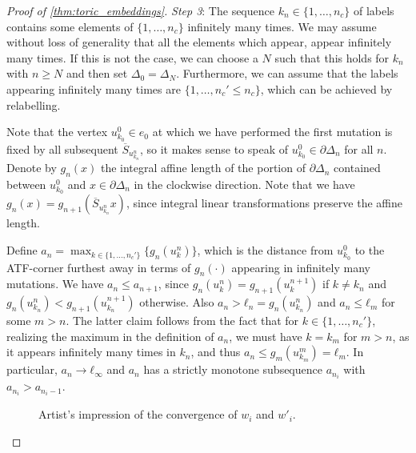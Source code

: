 \documentclass[12pt,a4paper,abstract=true,draft]{scrartcl}
\begin{document}
\begin{proof}[Proof of \cref{thm:toric_embeddings}]
  \emph{Step 3}: The sequence $k_n ∈ \{1,…,n_c\}$ of labels contains some elements of $\{1,…,n_c\}$ infinitely many times.
  We may assume without loss of generality that all the elements which appear, appear infinitely many times. If this is not the case, we can choose a $N$ such that this holds for $k_n$ with $n≥N$ and then set $Δ_0=Δ_N$. Furthermore, we can assume that the labels appearing infinitely many times are $\{1,…,n_c'≤n_c\}$, which can be achieved by relabelling.

  Note that the vertex $u_{k_0}^0 ∈ e_0$ at which we have performed the first mutation is fixed by all subsequent $\overline{S}_{u_{k_n}^n}$, so it makes sense to speak of $u_{k_0}^0 ∈ ∂Δ_n$ for all $n$.
  Denote by $g_n(x)$ the integral affine length of the portion of $\partial \Delta_n$ contained between $u_{k_0}^0$ and $x ∈ ∂Δ_n$ in the clockwise direction.
Note that we have $g_n(x) = g_{n+1}(\overline{S}_{u_{k_n}^n}x)$, since integral linear transformations preserve the affine length.

  Define $a_n = \max_{k ∈\{1,…,n_c'\}} \{g_n(u_k^n)\}$, which is the distance from $u_{k_0}^0$ to the  ATF-corner furthest away in terms of $g_n(\cdot)$ appearing in infinitely many mutations.
We have $a_n ≤ a_{n+1}$, since $g_n(u_k^n) = g_{n+1}(u_k^{n+1})$ if $k ≠ k_n$ and $g_n(u_{k_n}^n) < g_{n+1}(u_{k_n}^{n+1})$ otherwise.
Also $a_n > ℓ_n = g_n(u_{k_n}^n)$ and $a_n ≤ ℓ_m$ for some $m>n$. The latter claim follows from the fact that for $k ∈ \{1, …, n_c'\}$, realizing the maximum in the definition of $a_n$, we must have $k = k_m$ for $m>n$, as it appears infinitely many times in $k_n$, and thus $a_n ≤ g_m(u^m_{k_m}) = ℓ_m$.
In particular, $a_n → ℓ_∞$ and $a_n$ has a strictly monotone subsequence $a_{n_i}$ with $a_{n_i} > a_{n_i-1}$.

  \begin{figure}
    \centering
    \caption{Artist's impression of the convergence of $w_i$ and $w'_i$.}
    \label{fig:stretch_wi}
  \end{figure}


\end{proof}
\end{document}
